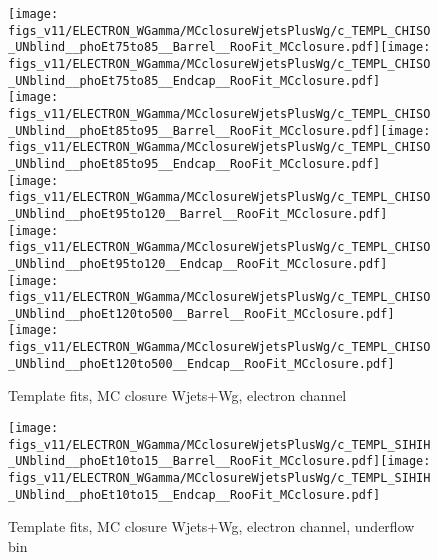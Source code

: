 \begin{figure}[htb]
  \begin{center}
   \texttt{[image: figs\_v11/ELECTRON\_WGamma/MCclosureWjetsPlusWg/c\_TEMPL\_CHISO\_UNblind\_\_phoEt75to85\_\_Barrel\_\_RooFit\_MCclosure.pdf]}\texttt{[image: figs\_v11/ELECTRON\_WGamma/MCclosureWjetsPlusWg/c\_TEMPL\_CHISO\_UNblind\_\_phoEt75to85\_\_Endcap\_\_RooFit\_MCclosure.pdf]}\\
   \texttt{[image: figs\_v11/ELECTRON\_WGamma/MCclosureWjetsPlusWg/c\_TEMPL\_CHISO\_UNblind\_\_phoEt85to95\_\_Barrel\_\_RooFit\_MCclosure.pdf]}\texttt{[image: figs\_v11/ELECTRON\_WGamma/MCclosureWjetsPlusWg/c\_TEMPL\_CHISO\_UNblind\_\_phoEt85to95\_\_Endcap\_\_RooFit\_MCclosure.pdf]}\\
   \texttt{[image: figs\_v11/ELECTRON\_WGamma/MCclosureWjetsPlusWg/c\_TEMPL\_CHISO\_UNblind\_\_phoEt95to120\_\_Barrel\_\_RooFit\_MCclosure.pdf]}\texttt{[image: figs\_v11/ELECTRON\_WGamma/MCclosureWjetsPlusWg/c\_TEMPL\_CHISO\_UNblind\_\_phoEt95to120\_\_Endcap\_\_RooFit\_MCclosure.pdf]}\\
   \texttt{[image: figs\_v11/ELECTRON\_WGamma/MCclosureWjetsPlusWg/c\_TEMPL\_CHISO\_UNblind\_\_phoEt120to500\_\_Barrel\_\_RooFit\_MCclosure.pdf]}\texttt{[image: figs\_v11/ELECTRON\_WGamma/MCclosureWjetsPlusWg/c\_TEMPL\_CHISO\_UNblind\_\_phoEt120to500\_\_Endcap\_\_RooFit\_MCclosure.pdf]}\\
  \label{fig:templateFits_MCclosureWjetsPlusWg_CHISO_ELECTRON_3}
  \caption{Template fits, MC closure Wjets+Wg, electron channel}
  \end{center}
\end{figure}

\begin{figure}[htb]
  \begin{center}
   \texttt{[image: figs\_v11/ELECTRON\_WGamma/MCclosureWjetsPlusWg/c\_TEMPL\_SIHIH\_UNblind\_\_phoEt10to15\_\_Barrel\_\_RooFit\_MCclosure.pdf]}\texttt{[image: figs\_v11/ELECTRON\_WGamma/MCclosureWjetsPlusWg/c\_TEMPL\_SIHIH\_UNblind\_\_phoEt10to15\_\_Endcap\_\_RooFit\_MCclosure.pdf]}\\
  \label{fig:templateFits_MCclosureWjetsPlusWg_SIHIH_ELECTRON_0}
  \caption{Template fits, MC closure Wjets+Wg, electron channel, underflow bin}
  \end{center}
\end{figure}

\

